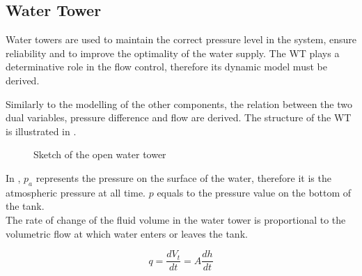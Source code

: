 \subsection{Water Tower} 
\label{WaterTankModel}

Water towers are used to maintain the correct pressure level in the system, ensure reliability and to improve the optimality of the water supply. The WT plays a determinative role in the flow control, therefore its dynamic model must be derived. 

Similarly to the modelling of the other components, the relation between the two dual variables, pressure difference and flow are  derived. The structure of the WT is illustrated in .


\begin{figure}[H]
\centering
 
\caption{Sketch of the open water tower}
\label{fig:watertower_sketch}
\end{figure}

In , $p_a$ represents the pressure on the surface of the water, therefore it is the atmospheric pressure at all time. $p$ equals to the pressure value on the bottom of the tank. \\
The rate of change of the fluid volume in the water tower is proportional to the volumetric flow at which water enters or leaves the tank. 

\begin{equation}
  q = \frac{dV_t}{dt} = A \frac{dh}{dt}
  \label{Flowequation}
\end{equation}


